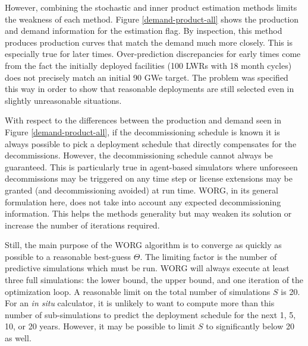 However, combining the stochastic and inner product estimation methods limits
the weakness of each method. Figure \ref{demand-product-all} shows the
production and demand information for the \allflag estimation flag.
By inspection,
this method produces production curves that match the demand much more
closely. This is especially true for later times. Over-prediction
discrepancies for early times come from the fact the initially deployed
facilities (100 LWRs with 18 month cycles) does not precisely match an
initial 90 GWe target. The problem was specified this way in order to show
that reasonable deployments are still selected even in slightly
unreasonable situations.

With respect to the differences between the production and demand seen in
Figure \ref{demand-product-all}, if the decommissioning schedule is known
it is always possible to pick a deployment schedule that directly
compensates for the decommissions. However, the decommissioning schedule
cannot always be guaranteed. This is particularly true in agent-based
simulators where unforeseen decommissions may be triggered on any time step
or license extensions may be granted (and decommissioning avoided) at
run time.
WORG, in its general formulation here, does not take into account any
expected decommissioning information. This helps the methods generality
but may weaken its solution or increase the number of iterations
required.

Still, the main purpose of the WORG algorithm is to converge as quickly as
possible to a reasonable best-guess $\Theta$. The limiting factor is the
number of
predictive simulations which must be run. WORG will always execute
at least three full simulations: the lower bound, the upper bound, and one
iteration of the optimization loop. A reasonable limit on the total number
of simulations $S$ is 20.  For an \emph{in situ} calculator, it is unlikely
to want to compute more than this number of sub-simulations to predict
the deployment schedule for the next 1, 5, 10, or 20 years. However, it
may be possible to limit $S$ to significantly below 20 as well.

